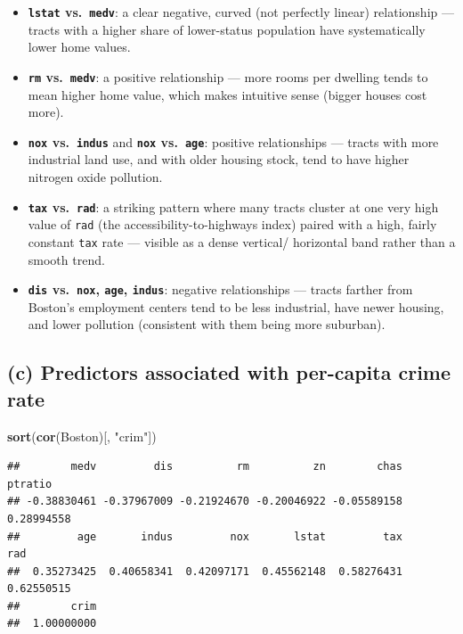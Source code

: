 \documentclass[
  11pt,
]{article}
\newenvironment{Shaded}{\begin{snugshade}}{\end{snugshade}}
\newcommand{\FunctionTok}[1]{\textcolor[rgb]{0.13,0.29,0.53}{\textbf{#1}}}
\newcommand{\NormalTok}[1]{#1}
\newcommand{\StringTok}[1]{\textcolor[rgb]{0.31,0.60,0.02}{#1}}
\providecommand{\tightlist}{%
  \setlength{\itemsep}{0pt}\setlength{\parskip}{0pt}}
\begin{document}
\begin{itemize}
\tightlist
\item
  \textbf{\texttt{lstat} vs.~\texttt{medv}}: a clear negative, curved
  (not perfectly linear) relationship --- tracts with a higher share of
  lower-status population have systematically lower home values.
\item
  \textbf{\texttt{rm} vs.~\texttt{medv}}: a positive relationship ---
  more rooms per dwelling tends to mean higher home value, which makes
  intuitive sense (bigger houses cost more).
\item
  \textbf{\texttt{nox} vs.~\texttt{indus}} and \textbf{\texttt{nox}
  vs.~\texttt{age}}: positive relationships --- tracts with more
  industrial land use, and with older housing stock, tend to have higher
  nitrogen oxide pollution.
\item
  \textbf{\texttt{tax} vs.~\texttt{rad}}: a striking pattern where many
  tracts cluster at one very high value of \texttt{rad} (the
  accessibility-to-highways index) paired with a high, fairly constant
  \texttt{tax} rate --- visible as a dense vertical/ horizontal band
  rather than a smooth trend.
\item
  \textbf{\texttt{dis} vs.~\texttt{nox}, \texttt{age}, \texttt{indus}}:
  negative relationships --- tracts farther from Boston's employment
  centers tend to be less industrial, have newer housing, and lower
  pollution (consistent with them being more suburban).
\end{itemize}

\subsection{(c) Predictors associated with per-capita crime
rate}\label{c-predictors-associated-with-per-capita-crime-rate}

\begin{Shaded}
\begin{Highlighting}[]
\FunctionTok{sort}\NormalTok{(}\FunctionTok{cor}\NormalTok{(Boston)[, }\StringTok{"crim"}\NormalTok{])}
\end{Highlighting}
\end{Shaded}

\begin{verbatim}
##        medv         dis          rm          zn        chas     ptratio 
## -0.38830461 -0.37967009 -0.21924670 -0.20046922 -0.05589158  0.28994558 
##         age       indus         nox       lstat         tax         rad 
##  0.35273425  0.40658341  0.42097171  0.45562148  0.58276431  0.62550515 
##        crim 
##  1.00000000
\end{verbatim}
\end{document}
